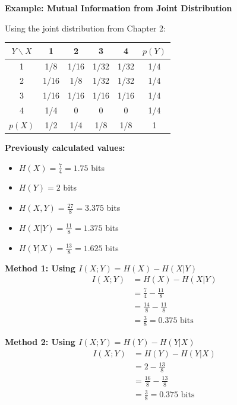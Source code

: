 \documentclass[11pt,a4paper]{book}
\newcounter{qna}[chapter]
\renewcommand{\theqna}{\thechapter.\arabic{qna}}
\newenvironment{questionanswerbox}{
    \refstepcounter{qna}%
    \begin{tcolorbox}[
        enhanced,
        breakable,
        colback=softlavender!10,
        colframe=softlavender!200,
        title={Example~\theqna}, %
        fonttitle=\bfseries,
        coltitle=white,
        colbacktitle=softlavender!200,
        sharp corners,
        boxrule=1pt,
        left=8pt,
        right=8pt,
        top=6pt,
        bottom=6pt
    ]
}{
    \end{tcolorbox}
}
\begin{document}
\begin{questionanswerbox}
    \textbf{Example: Mutual Information from Joint Distribution}
    
    Using the joint distribution from Chapter 2:
    
    \begin{center}
    \begin{tabular}{c|cccc|c}
    \(Y \backslash X\) & 1 & 2 & 3 & 4 & \(p(Y)\)\\ \hline
    1 & 1/8 & 1/16 & 1/32 & 1/32 & 1/4\\
    2 & 1/16 & 1/8 & 1/32 & 1/32 & 1/4\\
    3 & 1/16 & 1/16 & 1/16 & 1/16 & 1/4\\
    4 & 1/4 & 0 & 0 & 0 & 1/4\\ \hline
    \(p(X)\) & 1/2 & 1/4 & 1/8 & 1/8 & 1
    \end{tabular}
    \end{center}
    
    \textbf{Previously calculated values:}
    \begin{itemize}
        \item \(H(X) = \frac{7}{4} = 1.75\) bits
        \item \(H(Y) = 2\) bits
        \item \(H(X,Y) = \frac{27}{8} = 3.375\) bits
        \item \(H(X|Y) = \frac{11}{8} = 1.375\) bits
        \item \(H(Y|X) = \frac{13}{8} = 1.625\) bits
    \end{itemize}
    
    \hrulefill
    
    \textbf{Method 1: Using \(I(X;Y) = H(X) - H(X|Y)\)}
    \begin{align*}
    I(X;Y) &= H(X) - H(X|Y) \\
    &= \frac{7}{4} - \frac{11}{8} \\
    &= \frac{14}{8} - \frac{11}{8} \\
    &= \frac{3}{8} = 0.375 \text{ bits}
    \end{align*}
    
    \textbf{Method 2: Using \(I(X;Y) = H(Y) - H(Y|X)\)}
    \begin{align*}
    I(X;Y) &= H(Y) - H(Y|X) \\
    &= 2 - \frac{13}{8} \\
    &= \frac{16}{8} - \frac{13}{8} \\
    &= \frac{3}{8} = 0.375 \text{ bits}
    \end{align*}
    

\end{questionanswerbox}
\end{document}
